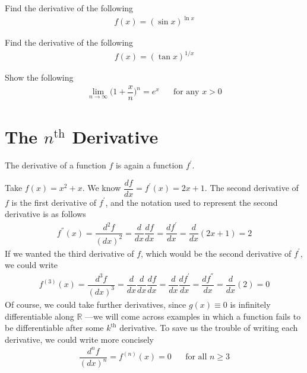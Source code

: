 \begin{exercise}
Find the derivative of the following
\begin{align*}
    f(x) = (\sin x)^{\ln x}
\end{align*}
\end{exercise}

\begin{exercise}
Find the derivative of the following
\begin{align*}
    f(x) = (\tan x)^{1/x}
\end{align*}
\end{exercise}

\begin{exercise}
Show the following
\begin{align*}
    \lim_{n \longrightarrow \infty} \Big(1+\dfrac{x}{n}\Big)^{n} = e^{x} \hspace{20pt} \text{for any} \hspace{4pt} x > 0
\end{align*}
\end{exercise}

\newpage
\section{The $n^{\text{th}}$ Derivative}

\begin{note}
The derivative of a function $f$ is again a function $f^{'}$. 
\end{note}

\begin{example}
Take $f(x) = x^{2} + x$. We know $\dfrac{df}{dx} = f^{'}(x) = 2x + 1$. The second derivative of $f$ is the first derivative of $f^{'}$, and the notation used to represent the second derivative is as follows
\begin{align*}
    f^{''}(x) = \dfrac{d^{2}f}{(dx)^{2}} = \dfrac{d}{dx}\dfrac{df}{dx} = \dfrac{df^{'}}{dx} =  \dfrac{d}{dx} (2x + 1) = 2  
\end{align*}
If we wanted the third derivative of $f$, which would be the second derivative of $f^{'}$, we could write
\begin{align*}
    f^{(3)}(x) = \dfrac{d^{3}f}{(dx)^{3}} = \dfrac{d}{dx}\dfrac{d}{dx}\dfrac{df}{dx} = \dfrac{d}{dx}\dfrac{df^{'}}{dx} = \dfrac{df^{''}}{dx} = \dfrac{d}{dx} (2) = 0
\end{align*}
Of course, we could take further derivatives, since $g(x) \equiv 0$ is infinitely differentiable along $\mathbb{R}$ ---we will come across examples in which a function fails to be differentiable after some $k^{\text{th}}$ derivative. To save us the trouble of writing each derivative, we could write more concisely
\begin{align*}
    \dfrac{d^{n}f}{(dx)^{n}} = f^{(n)}(x) = 0 \hspace{20pt} \text{for all} \hspace{4pt} n \geq 3
\end{align*}
\end{example}

